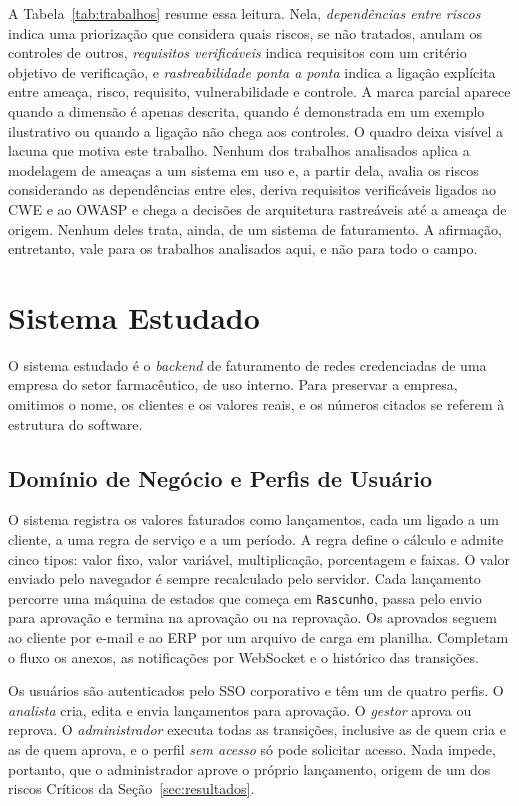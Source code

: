 \documentclass[conference]{IEEEtran}
\begin{document}
A Tabela~\ref{tab:trabalhos} resume essa leitura. Nela, \emph{dependências entre riscos} indica uma priorização que considera quais riscos, se não tratados, anulam os controles de outros, \emph{requisitos verificáveis} indica requisitos com um critério objetivo de verificação, e \emph{rastreabilidade ponta a ponta} indica a ligação explícita entre ameaça, risco, requisito, vulnerabilidade e controle. A marca parcial aparece quando a dimensão é apenas descrita, quando é demonstrada em um exemplo ilustrativo ou quando a ligação não chega aos controles. O quadro deixa visível a lacuna que motiva este trabalho. Nenhum dos trabalhos analisados aplica a modelagem de ameaças a um sistema em uso e, a partir dela, avalia os riscos considerando as dependências entre eles, deriva requisitos verificáveis ligados ao CWE e ao OWASP e chega a decisões de arquitetura rastreáveis até a ameaça de origem. Nenhum deles trata, ainda, de um sistema de faturamento. A afirmação, entretanto, vale para os trabalhos analisados aqui, e não para todo o campo.

\section{Sistema Estudado}
\label{sec:sistema}

O sistema estudado é o \textit{backend} de faturamento de redes credenciadas de uma empresa do setor farmacêutico, de uso interno. Para preservar a empresa, omitimos o nome, os clientes e os valores reais, e os números citados se referem à estrutura do software.

\subsection{Domínio de Negócio e Perfis de Usuário}
\label{subsec:dominio}

O sistema registra os valores faturados como lançamentos, cada um ligado a um cliente, a uma regra de serviço e a um período. A regra define o cálculo e admite cinco tipos: valor fixo, valor variável, multiplicação, porcentagem e faixas. O valor enviado pelo navegador é sempre recalculado pelo servidor. Cada lançamento percorre uma máquina de estados que começa em \texttt{Rascunho}, passa pelo envio para aprovação e termina na aprovação ou na reprovação. Os aprovados seguem ao cliente por e-mail e ao ERP por um arquivo de carga em planilha. Completam o fluxo os anexos, as notificações por WebSocket e o histórico das transições.

Os usuários são autenticados pelo SSO corporativo e têm um de quatro perfis. O \emph{analista} cria, edita e envia lançamentos para aprovação. O \emph{gestor} aprova ou reprova. O \emph{administrador} executa todas as transições, inclusive as de quem cria e as de quem aprova, e o perfil \emph{sem acesso} só pode solicitar acesso. Nada impede, portanto, que o administrador aprove o próprio lançamento, origem de um dos riscos Críticos da Seção~\ref{sec:resultados}.
\end{document}
